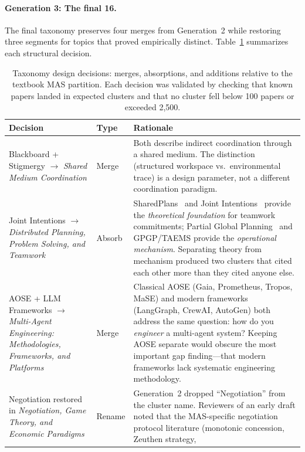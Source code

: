 \documentclass{article}
\begin{document}
\paragraph{Generation 3: The final 16.}
The final taxonomy preserves four merges from Generation~2 while restoring three
segments for topics that proved empirically distinct. Table~\ref{tab:taxonomy-decisions}
summarizes each structural decision.

\begin{table}[t]
\centering
\small
\caption{Taxonomy design decisions: merges, absorptions, and additions relative to the
textbook MAS partition. Each decision was validated by checking that known papers
landed in expected clusters and that no cluster fell below 100 papers or exceeded 2,500.}
\label{tab:taxonomy-decisions}
\begin{tabular}{@{} p{4.5cm} l p{8.5cm} @{}}
\toprule
\textbf{Decision} & \textbf{Type} & \textbf{Rationale} \\
\midrule
Blackboard + Stigmergy $\to$ \emph{Shared Medium Coordination}
  & Merge & Both describe indirect coordination through a shared medium.
    The distinction (structured workspace vs.\ environmental trace) is a
    design parameter, not a different coordination paradigm. \\[4pt]
Joint Intentions $\to$ \emph{Distributed Planning, Problem Solving, and Teamwork}
  & Absorb & SharedPlans~\citep{grosz1996collaborative} and Joint
    Intentions~\citep{cohen1990intention} provide the \emph{theoretical
    foundation} for teamwork commitments; Partial Global
    Planning~\citep{durfee1991pgp} and GPGP/TAEMS provide the
    \emph{operational mechanism}. Separating theory from mechanism
    produced two clusters that cited each other more than they cited
    anyone else. \\[4pt]
AOSE + LLM Frameworks $\to$ \emph{Multi-Agent Engineering: Methodologies, Frameworks, and Platforms}
  & Merge & Classical AOSE (Gaia, Prometheus, Tropos, MaSE) and modern
    frameworks (LangGraph, CrewAI, AutoGen) both address the same
    question: how do you \emph{engineer} a multi-agent system? Keeping
    AOSE separate would obscure the most important gap finding---that
    modern frameworks lack systematic engineering methodology. \\[4pt]
Negotiation restored in \emph{Negotiation, Game Theory, and Economic Paradigms}
  & Rename & Generation~2 dropped ``Negotiation'' from the cluster name.
    Reviewers of an early draft noted that the MAS-specific negotiation
    protocol literature (monotonic concession, Zeuthen strategy,

\end{tabular}
\end{table}
\end{document}
